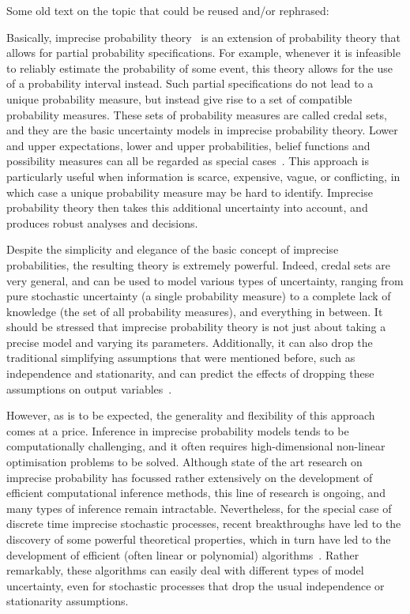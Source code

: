 \documentclass[11pt,dvipsnames,usenames,a4paper]{article}
\begin{document}
{\color{Gray}
Some old text on the topic that could be reused and/or rephrased:

Basically, imprecise probability theory~\cite{augustin2013:itip,walley1991,troffaes2013:lp} is an extension of probability theory that allows for partial probability specifications.
For example, whenever it is infeasible to reliably estimate the probability of some event, this theory allows for the use of a probability interval instead.
Such partial specifications do not lead to a unique probability measure, but instead give rise to a set of compatible probability measures.
These sets of probability measures are called credal sets, and they are the basic uncertainty models in imprecise probability theory.
Lower and upper expectations, lower and upper probabilities, belief functions and possibility measures can all be regarded as special cases~\cite{walley2000}.
This approach is particularly useful when information is scarce, expensive, vague, or conflicting, in which case a unique probability measure may be hard to identify. Imprecise probability theory then takes this additional uncertainty into account, and produces robust analyses and decisions.

Despite the simplicity and elegance of the basic concept of imprecise probabilities, the resulting theory is extremely powerful.
Indeed, credal sets are very general, and can be used to model various types of uncertainty, ranging from pure stochastic uncertainty (a single probability measure) to a complete lack of knowledge (the set of all probability measures), and everything in between.
It should be stressed that imprecise probability theory is not just about taking a precise model and varying its parameters.
Additionally, it can also drop the traditional simplifying assumptions that were mentioned before, such as independence and stationarity, and can predict the effects of dropping these assumptions on output variables~\cite{couso1999b,walley1991,cozman2000}.

However, as is to be expected, the generality and flexibility of this approach comes at a price.
Inference in imprecise probability models tends to be computationally challenging, and it often requires high-dimensional non-linear optimisation problems to be solved.
Although state of the art research on imprecise probability has focussed rather extensively on the development of efficient computational inference methods, this line of research is ongoing, and many types of inference remain intractable.
Nevertheless, for the special case of discrete time imprecise stochastic processes, recent breakthroughs have led to the discovery of some powerful theoretical properties, which in turn have led to the development  of efficient (often linear or polynomial) algorithms~\cite{cooman2009,cooman2008}.
Rather remarkably, these algorithms can easily deal with different types of model uncertainty, even for stochastic processes that drop the usual independence or stationarity assumptions.

}
\end{document}
